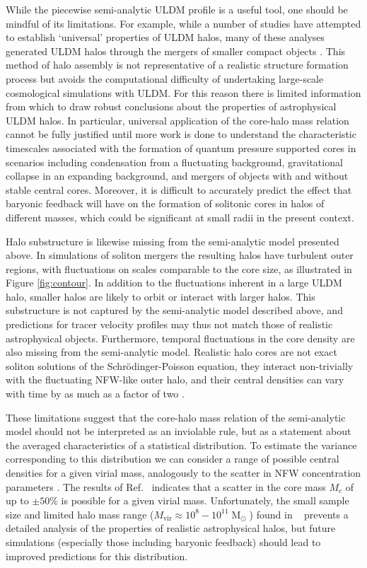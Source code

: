 \documentclass{pasa}%
\begin{document}
While the piecewise semi-analytic ULDM profile is a useful tool, one should be mindful of its  limitations. For example, while a number of studies have attempted to establish  `universal' properties of ULDM halos, many of these analyses generated ULDM halos through the mergers of smaller compact objects  \cite{Schwabe:2016rze, Mocz:2017wlg}. This method of halo assembly is not representative of a realistic structure formation process but  avoids the computational difficulty of undertaking large-scale cosmological simulations with ULDM. For this reason there is limited information from which to draw robust conclusions about the properties of astrophysical ULDM halos. In particular, universal application of the core-halo mass relation cannot be fully justified until more work is done to understand the characteristic timescales associated with the formation of quantum pressure supported cores in scenarios including condensation from a fluctuating background, gravitational collapse in an expanding background, and mergers of objects with and without stable central cores. Moreover, it is difficult to accurately predict the effect that baryonic feedback will have on the formation of solitonic cores in halos of different masses, which could be significant at small radii in the present context.

Halo substructure is likewise missing from the semi-analytic model presented above. In simulations of soliton mergers the resulting halos have turbulent outer regions, with fluctuations on scales comparable to the core size, as illustrated in Figure \ref{fig:contour}. In addition to the fluctuations inherent in a large ULDM halo, smaller halos are likely to orbit or interact with larger halos. This   substructure is not captured by the semi-analytic model described above, and predictions for tracer velocity profiles may thus not match those of realistic astrophysical objects. Furthermore, temporal fluctuations in the core density are also missing from the semi-analytic model. Realistic halo cores are not exact soliton solutions of the Schr\"{o}dinger-Poisson equation,  they interact non-trivially with the fluctuating NFW-like outer halo, and their central densities can vary with time by as much as a factor of two \cite{Veltmaat:2018dfz}.

These limitations suggest that the core-halo mass relation of the semi-analytic model should not be interpreted  as an inviolable rule, but as a statement about the averaged characteristics of a statistical distribution. To estimate the variance corresponding to this distribution  we can consider a range of possible central densities for a given virial mass, analogously to the scatter in NFW concentration parameters \cite{Maccio:2008pcd}. The results of Ref.~\cite{Schive:2014hza}  indicates that a scatter in the core mass $M_c$ of up to $\pm 50\%$ is possible for a given virial mass. Unfortunately, the small sample size and limited halo mass range ($ M_{\mathrm{vir}} \approx 10^8-10^{11} \operatorname{M}_{\odot}$) found in ~\cite{Schive:2014hza}  prevents a detailed analysis of the properties of realistic astrophysical halos,  but future simulations (especially those including baryonic feedback) should lead to improved predictions for this distribution. 
\end{document}

